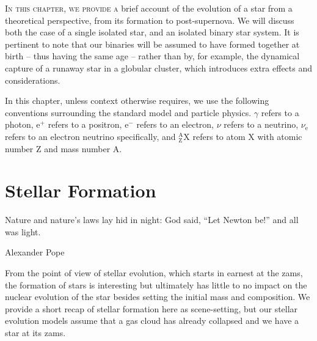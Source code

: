 
\label{chap:theoretical_background}

\lettrine[lines=3]{I}{n this chapter, we provide a} brief account of the evolution of a star from a theoretical perspective, from its formation to post-supernova. We will discuss both the case of a single isolated star, and an isolated binary star system. It is pertinent to note that our binaries will be assumed to have formed together at birth -- thus having the same age -- rather than by, for example, the dynamical capture of a runaway star in a globular cluster, which introduces extra effects and considerations.

In this chapter, unless context otherwise requires, we use the following conventions surrounding the standard model and particle physics. $\gamma$ refers to a photon, e$^+$ refers to a positron, e$^-$ refers to an electron, $\nu$ refers to a neutrino, $\nu_\text{e}$ refers to an electron neutrino specifically, and  ${}^\mathrm{A}_\mathrm{Z}\text{X}$ refers to atom X with atomic number Z and mass number A.

\section{Stellar Formation}\label{sec:stellar_formation}

\epigraph{Nature and nature's laws lay hid in night: God said, ``Let Newton be!'' and all was light.}{Alexander Pope}

From the point of view of stellar evolution, which starts in earnest at the \gls{zams}, the formation of stars is interesting but ultimately has little to no impact on the nuclear evolution of the star besides setting the initial mass and composition. We provide a short recap of stellar formation here as scene-setting, but our stellar evolution models assume that a gas cloud has already collapsed and we have a star at its \gls{zams}.

